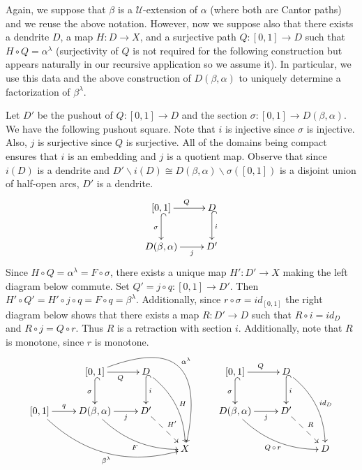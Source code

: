 \documentclass[12pt, leqno]{amsart}
\newcommand{\light}{\lambda}
\newcommand{\ui}{[0,1]}
\newcommand{\scru}{\mathscr{U}}
\theoremstyle{definition}\newtheorem{definition}[theorem]{Definition}
\begin{document}
Again, we suppose that $\beta$ is a $\scru$-extension of $\alpha$ (where both are Cantor paths) and we reuse the above notation. However, now we suppose also that there exists a dendrite $D$, a map $H:D\to X$, and a surjective path $Q:\ui\to D$ such that $H\circ Q= \alpha^{\light}$ (surjectivity of $Q$ is not required for the following construction but appears naturally in our recursive application so we assume it). In particular, we use this data and the above construction of $D(\beta,\alpha)$ to uniquely determine a factorization of $\beta^{\lambda}$.

Let $D'$ be the pushout of $Q:\ui\to D$ and the section $\sigma:\ui\to D(\beta,\alpha)$. We have the following pushout square. Note that $i$ is injective since $\sigma$ is injective. Also, $j$ is surjective since $Q$ is surjective. All of the domains being compact ensures that $i$ is an embedding and $j$ is a quotient map. Observe that since $i(D)$ is a dendrite and $D'\backslash i(D)\cong D(\beta,\alpha)\backslash \sigma(\ui)$ is a disjoint union of half-open arcs, $D'$ is a dendrite.
\[\xymatrix{
\ui \ar[r]^{Q} \ar@{^{(}->}[d]_{\sigma} & D \ar@{^{(}->}[d]^-{i} \\
D(\beta,\alpha) \ar[r]_-{j}  & D'
}\]
Since $H\circ Q=\alpha^{\light}=F\circ \sigma$, there exists a unique map $H':D'\to X$ making the left diagram below commute. Set $Q'=j\circ q:\ui\to D'$. Then $H'\circ Q'=H' \circ j\circ q=F\circ q=\beta^{\light}$. Additionally, since $r\circ \sigma=id_{\ui}$ the right diagram below shows that there exists a map $R:D'\to D$ such that $R\circ i=id_{D}$ and $R\circ j=Q\circ r$. Thus $R$ is a retraction with section $i$. Additionally, note that $R$ is monotone, since $r$ is monotone.
\[\xymatrix{
& \ui \ar@/^5pc/[ddrr]^-{\alpha^{\lambda}} \ar[r]_{Q}   \ar@{^{(}->}[d]_{\sigma} & D \ar@/^1pc/[ddr]^-{H} \ar@{^{(}->}[d]^-{i} && \ui \ar[r]^{Q}   \ar@{^{(}->}[d]_{\sigma} & D \ar@/^1pc/[ddr]^-{id_{D}} \ar@{^{(}->}[d]^-{i}
\\
\ui \ar[r]^-{q} \ar@/_2pc/[drrr]_-{\beta^{\lambda}} & D(\beta,\alpha) \ar@/_1pc/[drr]_-{F} \ar[r]_-{j}  & D' \ar@{-->}[dr]^-{H'} && D(\beta,\alpha) \ar@/_1pc/[drr]_-{Q\hspace{.125em}\circ \hspace{.125em} r } \ar[r]_-{j}  & D' \ar@{-->}[dr]^-{R}
 \\
&&& X & && D
}\]
\end{document}

